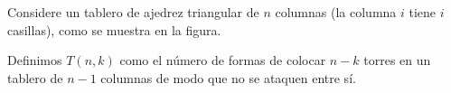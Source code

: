 Considere un tablero de ajedrez triangular de \(n\) columnas (la columna \(i\) tiene \(i\) casillas), como se muestra en la figura.
\begin{center}
\end{center}


Definimos \(T(n,k)\) como el número de formas de colocar \(n-k\) torres en un tablero de \(n-1\) columnas de modo que no se ataquen entre sí.